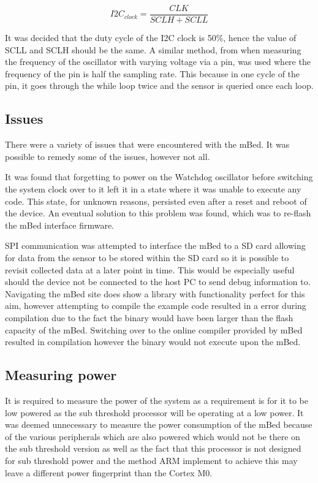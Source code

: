 \begin{equation}
	I2C_{clock} = \frac{CLK}{SCLH + SCLL}
	\label{eqn:i2c_clock}
\end{equation}

It was decided that the duty cycle of the I2C clock is 50\%, hence the value of SCLL and SCLH should be the same. A similar method, from when measuring the frequency of the oscillator with varying voltage via a pin, was used where the frequency of the pin is half the sampling rate. This because in one cycle of the pin, it goes through the while loop twice and the sensor is queried once each loop.

\subsection{Issues}

There were a variety of issues that were encountered with the mBed. It was possible to remedy some of the issues, however not all.

It was found that forgetting to power on the Watchdog oscillator before switching the system clock over to it left it in a state where it was unable to execute any code. This state, for unknown reasons, persisted even after a reset and reboot of the device. An eventual solution to this problem was found, which was to re-flash the mBed interface firmware.

SPI communication was attempted to interface the mBed to a SD card allowing for data from the sensor to be stored within the SD card so it is possible to revisit collected data at a later point in time. This would be especially useful should the device not be connected to the host PC to send debug information to. Navigating the mBed site does show a library with functionality perfect for this aim, however attempting to compile the example code resulted in a error during compilation due to the fact the binary would have been larger than the flash capacity of the mBed. Switching over to the online compiler provided by mBed resulted in compilation however the binary would not execute upon the mBed. 

\subsection{Measuring power}

It is required to measure the power of the system as a requirement is for it to be low powered as the sub threshold processor will be operating at a low power. It was deemed unnecessary to measure the power consumption of the mBed because of the various peripherals which are also powered which would not be there on the sub threshold version as well as the fact that this processor is not designed for sub threshold power and the method ARM implement to achieve this may leave a different power fingerprint than the Cortex M0. 

